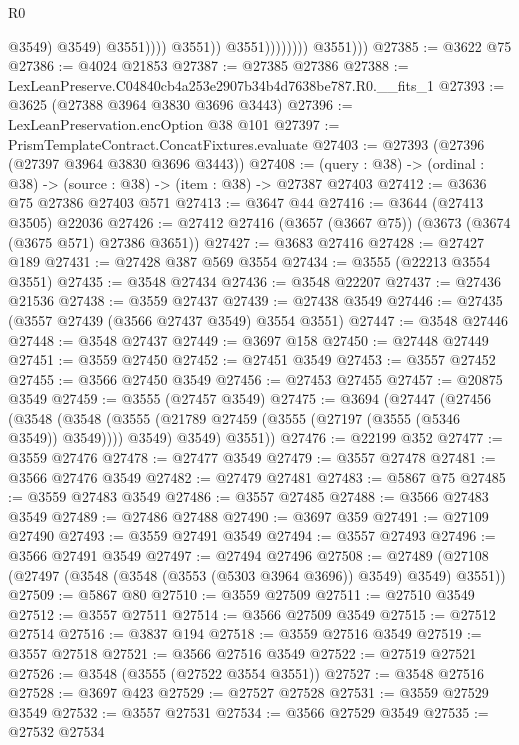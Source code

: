 \begin{lexlean}{R0}
\begin{coremodule}
                                          @3549)
                                        @3549)
                                      @3551))))
                              @3551))
                          @3551))))))))
          @3551)))
@27385 := @3622 @75
@27386 := @4024 @21853
@27387 := @27385 @27386
@27388 := LexLeanPreserve.C04840cb4a253e2907b34b4d7638be787.R0.__fits_1
@27393 := @3625 (@27388 @3964 @3830 @3696 @3443)
@27396 := LexLeanPreservation.encOption @38 @101
@27397 := PrismTemplateContract.ConcatFixtures.evaluate
@27403 := @27393 (@27396 (@27397 @3964 @3830 @3696 @3443))
@27408 := (query : @38) -> (ordinal : @38) -> (source : @38) -> (item : @38) -> @27387 @27403
@27412 := @3636 @75 @27386 @27403 @571
@27413 := @3647 @44
@27416 := @3644 (@27413 @3505) @22036
@27426 := @27412 @27416 (@3657 (@3667 @75)) (@3673 (@3674 (@3675 @571) @27386 @3651))
@27427 := @3683 @27416
@27428 := @27427 @189
@27431 := @27428 @387 @569 @3554
@27434 := @3555 (@22213 @3554 @3551)
@27435 := @3548 @27434
@27436 := @3548 @22207
@27437 := @27436 @21536
@27438 := @3559 @27437
@27439 := @27438 @3549
@27446 := @27435 (@3557 @27439 (@3566 @27437 @3549) @3554 @3551)
@27447 := @3548 @27446
@27448 := @3548 @27437
@27449 := @3697 @158
@27450 := @27448 @27449
@27451 := @3559 @27450
@27452 := @27451 @3549
@27453 := @3557 @27452
@27455 := @3566 @27450 @3549
@27456 := @27453 @27455
@27457 := @20875 @3549
@27459 := @3555 (@27457 @3549)
@27475 := @3694
    (@27447
      (@27456
        (@3548
          (@3548 (@3555 (@21789 @27459 (@3555 (@27197 (@3555 (@5346 @3549)) @3549)))) @3549)
          @3549)
        @3551))
@27476 := @22199 @352
@27477 := @3559 @27476
@27478 := @27477 @3549
@27479 := @3557 @27478
@27481 := @3566 @27476 @3549
@27482 := @27479 @27481
@27483 := @5867 @75
@27485 := @3559 @27483 @3549
@27486 := @3557 @27485
@27488 := @3566 @27483 @3549
@27489 := @27486 @27488
@27490 := @3697 @359
@27491 := @27109 @27490
@27493 := @3559 @27491 @3549
@27494 := @3557 @27493
@27496 := @3566 @27491 @3549
@27497 := @27494 @27496
@27508 := @27489 (@27108 (@27497 (@3548 (@3548 (@3553 (@5303 @3964 @3696)) @3549) @3549) @3551))
@27509 := @5867 @80
@27510 := @3559 @27509
@27511 := @27510 @3549
@27512 := @3557 @27511
@27514 := @3566 @27509 @3549
@27515 := @27512 @27514
@27516 := @3837 @194
@27518 := @3559 @27516 @3549
@27519 := @3557 @27518
@27521 := @3566 @27516 @3549
@27522 := @27519 @27521
@27526 := @3548 (@3555 (@27522 @3554 @3551))
@27527 := @3548 @27516
@27528 := @3697 @423
@27529 := @27527 @27528
@27531 := @3559 @27529 @3549
@27532 := @3557 @27531
@27534 := @3566 @27529 @3549
@27535 := @27532 @27534

\end{coremodule}
\end{lexlean}
